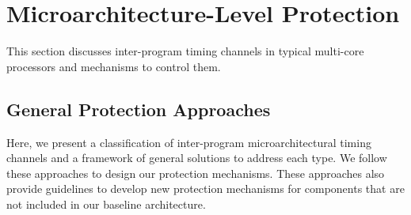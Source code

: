 \section{Microarchitecture-Level Protection}

This section discusses inter-program timing channels in typical
multi-core processors and mechanisms to control them.

%
%
%
%

\subsection{General Protection Approaches}
\label{sec:general_approaches}

Here, we present a classification of inter-program microarchitectural timing 
channels and a framework of general solutions to address each type.
We follow these approaches to design our
protection mechanisms. These approaches also provide guidelines to
develop new protection mechanisms for components that are not included in
our baseline architecture.

